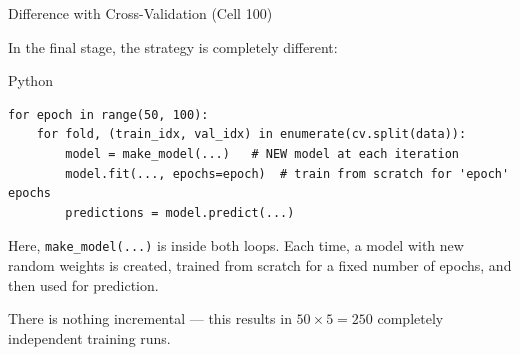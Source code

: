 \documentclass[aspectratio=169, 11pt]{beamer}
\begin{document}
\begin{frame}[fragile]{Difference with Cross-Validation (Cell 100)}

In the final stage, the strategy is completely different:

\vspace{0.3cm}

\begin{block}{Python}
\scriptsize
\begin{verbatim}
for epoch in range(50, 100):
    for fold, (train_idx, val_idx) in enumerate(cv.split(data)):
        model = make_model(...)   # NEW model at each iteration
        model.fit(..., epochs=epoch)  # train from scratch for 'epoch' epochs
        predictions = model.predict(...)
\end{verbatim}
\end{block}

\vspace{0.3cm}

Here, \texttt{make\_model(...)} is inside both loops. Each time, a model with new random weights is created, trained from scratch for a fixed number of epochs, and then used for prediction.

\vspace{0.3cm}

There is nothing incremental — this results in $50 \times 5 = 250$ completely independent training runs.

\end{frame}
%
%
\end{document}
